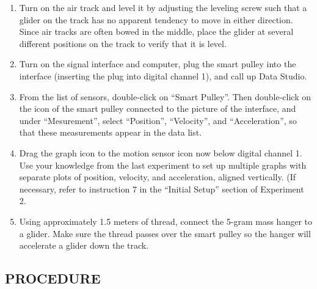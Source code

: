 \begin{enumerate}[label=\arabic*.]

\item Turn on the air track and level it by adjusting the leveling screw such that a glider on the track has no apparent tendency to move in either direction.  Since air tracks are often bowed in the middle, place the glider at several different positions on the track to verify that it is level.

\item Turn on the signal interface and computer, plug the smart pulley into the interface (inserting the plug into digital channel 1), and call up Data Studio.

\item From the list of sensors, double-click on ``Smart Pulley''.  Then double-click on the icon of the smart pulley connected to the picture of the interface, and under ``Mesurement'', select ``Position'', ``Velocity'', and ``Acceleration'', so that these measurements appear in the data list.

\item Drag the graph icon to the motion sensor icon now below digital channel 1.  Use your knowledge from the last experiment to set up multiple graphs with separate plots of position, velocity, and acceleration, aligned vertically.  (If necessary, refer to instruction 7 in the ``Initial Setup'' section of Experiment 2.

\item Using approximately 1.5 meters of thread, connect the 5-gram mass hanger to a glider.  Make sure the thread passes over the smart pulley so the hanger will accelerate a glider down the track.

\end{enumerate}

\subsection*{PROCEDURE}

